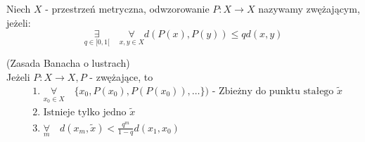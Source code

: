 \documentclass[../main.tex]{subfiles}
\begin{document}
\begin{definicja}
    Niech $X$ - przestrzeń metryczna, odwzorowanie $P: X\to X$ nazywamy zwężającym, jeżeli:
    \begin{equation}\label{eq:zwezajace}
        \underset{q\in [0,1[}{\exists}\quad \underset{x,y\in X}{\forall} d(P(x),P(y)) \leq q d(x,y)
    \end{equation}
\end{definicja}

\pagebreak
\begin{tw}
    (Zasada Banacha o lustrach)\\
    Jeżeli $P: X \to X, P$ - zwężające, to
    \begin{align}\label{eq:banach}
        &\text{1. } \underset{x_0 \in X}{\forall}\quad \{x_0,P(x_0),P(P(x_0)),\dots\}) \text{ - Zbieżny do punktu stałego } \tilde x\\
        &\text{2. Istnieje tylko jedno }\tilde x\\
        &\text{3. } \underset{m}{\forall}\quad d(x_m,\tilde x) < \frac{q^m}{1-q} d(x_1, x_0)
    \end{align}
\end{tw}
\end{document}
